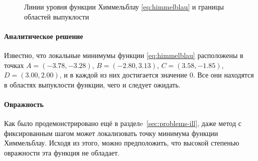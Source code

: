 \begin{figure}[thb]
  \centering
  \caption[Функция Химмельблау]{Линии уровня функции Химмельблау
    \eqref{eq:himmelblau} и границы областей выпуклости}
  \label{fig:himmelblau-conv}
\end{figure}

\paragraph{Аналитическое решение}
Известно, что локальные минимумы функции \eqref{eq:himmelblau}
расположены в точках $A=(-3.78, -3.28)$, $B=(-2.80, 3.13)$, $C=(3.58,
-1.85)$, \mbox{$D=(3.00, 2.00)$}, и в каждой из них достигается
значение $0$. Все они находятся в областях выпуклости функции, чего и
следует ожидать.

\paragraph{Овражность}
Как было продемонстрировано ещё в разделe \ref{sec:problems-ill}, даже
метод \gd{} с фиксированным шагом может локализовать точку минимума
функции Химмельблау. Исходя из этого, можно предположить, что высокой
степенью овражности эта функция не обладает.

